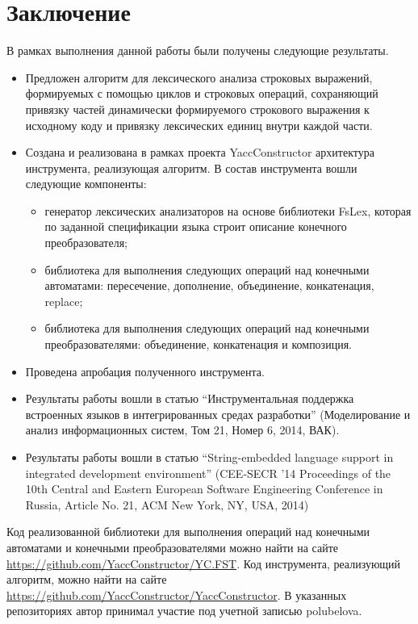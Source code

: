 \section*{Заключение}
В рамках выполнения данной работы были получены следующие результаты.

\begin{itemize}
\item Предложен алгоритм для лексического анализа строковых выражений, формируемых с помощью циклов и строковых операций, сохраняющий привязку частей динамически формируемого строкового выражения к исходному коду и привязку лексических единиц внутри каждой части.
\item Создана и реализована в рамках проекта YaccConstructor архитектура инструмента, реализующая алгоритм. В состав инструмента вошли следующие компоненты: 
\begin{itemize}
\item генератор лексических анализаторов на основе библиотеки FsLex, которая по заданной спецификации языка строит описание конечного преобразователя;
\item библиотека для выполнения следующих операций над конечными автоматами: пересечение, дополнение, объединение, конкатенация, replace;
\item библиотека для выполнения следующих операций над конечными преобразователями: объединение, конкатенация и композиция.
\end{itemize}
\item Проведена апробация полученного инструмента.
\item Результаты работы вошли в статью ``Инструментальная поддержка встроенных языков в
интегрированных средах разработки'' (Моделирование и анализ информационных систем, Том 21, Номер 6, 2014, ВАК).
\item Результаты работы вошли в статью ``String-embedded language support in integrated development environment'' (CEE-SECR '14 Proceedings of the 10th Central and Eastern European Software Engineering Conference in Russia, Article No. 21, ACM New York, NY, USA, 2014)
\end{itemize}

Код реализованной библиотеки для выполнения операций над конечными автоматами и конечными преобразователями можно найти на сайте \url{https://github.com/YaccConstructor/YC.FST}. Код инструмента, реализующий алгоритм, можно найти на сайте \url{https://github.com/YaccConstructor/YaccConstructor}. В указанных репозиториях автор принимал участие под учетной записью polubelova.


